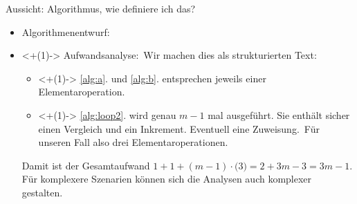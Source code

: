 \begin{frame}{Aussicht: Algorithmus, wie definiere ich das?}
\begin{itemize}[]
    \item Algorithmenentwurf: \\
    \usebox\algobox
    \item<+(1)-> Aufwandsanalyse:\pause\ Wir machen dies als strukturierten Text: \begin{itemize}
        \item<+(1)-> \ref{alg:a}. und \ref{alg:b}. entsprechen jeweils einer Elementaroperation.
        \item<+(1)-> \ref{alg:loop2}. wird genau \(m - 1\) mal ausgeführt. Sie enthält sicher einen Vergleich und ein Inkrement. Eventuell eine Zuweisung.\pause\ Für unseren Fall also drei Elementaroperationen.
    \end{itemize}
        \pause Damit ist der Gesamtaufwand \(1 + 1 + (m - 1) \cdot \bigl( 3 \bigr) = 2 + 3m - 3 = 3m - 1\).\medskip\\
        \pause Für komplexere Szenarien können sich die Analysen auch komplexer gestalten.
\end{itemize}
\end{frame}
\fi


\iffull\fi
